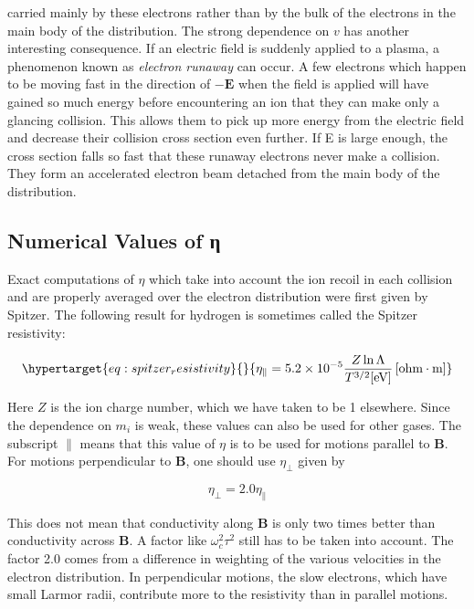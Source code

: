 \documentclass[
  notoc %
]{tufte-book}
\begin{document}
\begin{enumerate}
  carried mainly by these electrons rather than by the bulk of the
  electrons in the main body of the distribution. The strong dependence
  on \(v\) has another interesting consequence. If an electric field is
  suddenly applied to a plasma, a phenomenon known as \emph{electron
  runaway} can occur. A few electrons which happen to be moving fast in
  the direction of \(-\mathbf{E}\) when the field is applied will have
  gained so much energy before encountering an ion that they can make
  only a glancing collision. This allows them to pick up more energy
  from the electric field and decrease their collision cross section
  even further. If E is large enough, the cross section falls so fast
  that these runaway electrons never make a collision. They form an
  accelerated electron beam detached from the main body of the
  distribution.
\end{enumerate}

\hypertarget{numerical-values-of-ux3b7}{%
\subsection{Numerical Values of η}\label{numerical-values-of-ux3b7}}

Exact computations of \(\eta\) which take into account the ion recoil in
each collision and are properly averaged over the electron distribution
were first given by Spitzer. The following result for hydrogen is
sometimes called the Spitzer resistivity:

\begin{equation}\protect\hypertarget{eq:spitzer_resistivity}{}{
\eta_\parallel = 5.2\times 10^{-5}\frac{Z\ln\Lambda}{T^{3/2}[\text{eV}]}\, [\text{ohm}\cdot\text{m}]
}\label{eq:spitzer_resistivity}\end{equation}

Here \(Z\) is the ion charge number, which we have taken to be 1
elsewhere. Since the dependence on \(m_i\) is weak, these values can
also be used for other gases. The subscript \(\parallel\) means that
this value of \(\eta\) is to be used for motions parallel to
\(\mathbf{B}\). For motions perpendicular to \(\mathbf{B}\), one should
use \(\eta_\perp\) given by

\[
\eta_\perp = 2.0 \eta_\parallel
\]

This does not mean that conductivity along \(\mathbf{B}\) is only two
times better than conductivity across \(\mathbf{B}\). A factor like
\(\omega_c^2\tau^2\) still has to be taken into account. The factor 2.0
comes from a difference in weighting of the various velocities in the
electron distribution. In perpendicular motions, the slow electrons,
which have small Larmor radii, contribute more to the resistivity than
in parallel motions.
\end{document}
